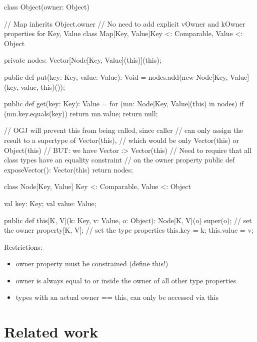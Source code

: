 \documentclass[preprint,nocopyrightspace,9pt]{sigplanconf}
\begin{document}
\begin{xten}
class Object(owner: Object) { }

// Map inherits Object.owner
// No need to add explicit vOwner and kOwner properties for Key, Value
class Map[Key, Value]{Key <: Comparable, Value <: Object}
{
    private nodes: Vector[Node[Key, Value](this)](this);

    public def put(key: Key, value: Value): Void = {
        nodes.add(new Node[Key, Value](key, value, this)());
    }

    public def get(key: Key): Value = {
        for (mn: Node[Key, Value](this) in nodes) {
            if (mn.key.equals(key))
                return mn.value;
        }
        return null;
    }

    // OGJ will prevent this from being called, since caller
    // can only assign the result to a supertype of Vector(this),
    // which would be only Vector(this) or Object(this)
    // BUT: we have Vector :> Vector(this)
    // Need to require that all class types have an equality constraint
    // on the owner property
    public def exposeVector(): Vector(this) { return nodes; }
}

class Node[Key, Value]
    {Key <: Comparable, Value <: Object}
{
    val key: Key;
    val value: Value;

    public def this[K, V](k: Key, v: Value, o: Object): Node[K, V](o) {
        super(o);               // set the owner
        property[K, V];         // set the type properties
        this.key = k;
        this.value = v;
    }
}
\end{xten}

Restrictions:
\begin{itemize}
\item owner property must be constrained (define this!)
\item owner is always equal to or inside the owner of all other type properties
\item types with an actual owner == this, can only be accessed via this
\end{itemize}


                        


\section{Related work}

\cite{unifying-genericity}
\cite{adding-wildcards}
\cite{emir06}
\cite{myers94}
\cite{polyj}
\cite{allen04}
\cite{allen03}
\cite{beta}
\cite{mp89-virtual-classes}
\cite{thorup97}
\end{document}
